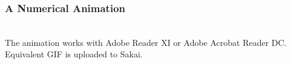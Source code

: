 \begin{frame}
\frametitle{A Numerical Animation}
\\
The animation works with Adobe Reader XI or Adobe Acrobat Reader DC. Equivalent GIF is uploaded to Sakai.
\end{frame}
\begin{frame}

\end{frame}
